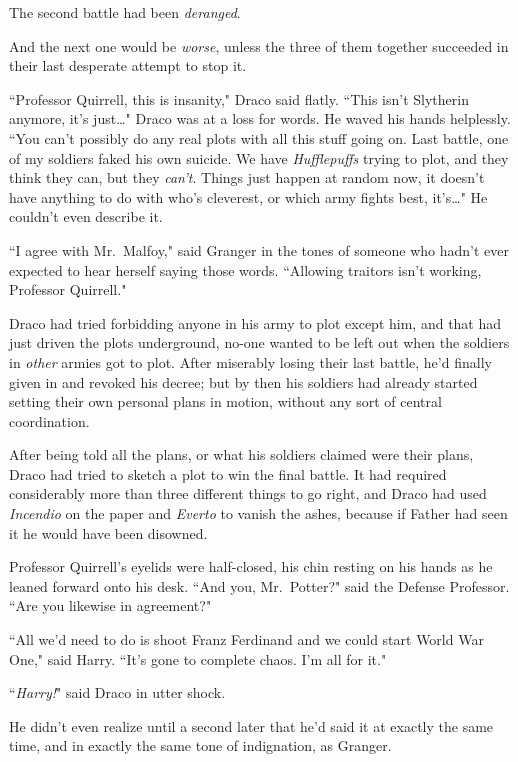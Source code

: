 The second battle had been \emph{deranged}.

And the next one would be \emph{worse}, unless the three of them together succeeded in their last desperate attempt to stop it.

``Professor Quirrell, this is insanity," Draco said flatly. ``This isn't Slytherin anymore, it's just{\ldots}" Draco was at a loss for words. He waved his hands helplessly. ``You can't possibly do any real plots with all this stuff going on. Last battle, one of my soldiers faked his own suicide. We have \emph{Hufflepuffs} trying to plot, and they think they can, but they \emph{can't}. Things just happen at random now, it doesn't have anything to do with who's cleverest, or which army fights best, it's{\ldots}" He couldn't even describe it.

``I agree with Mr.~Malfoy," said Granger in the tones of someone who hadn't ever expected to hear herself saying those words. ``Allowing traitors isn't working, Professor Quirrell."

Draco had tried forbidding anyone in his army to plot except him, and that had just driven the plots underground, no-one wanted to be left out when the soldiers in \emph{other} armies got to plot. After miserably losing their last battle, he'd finally given in and revoked his decree; but by then his soldiers had already started setting their own personal plans in motion, without any sort of central coordination.

After being told all the plans, or what his soldiers claimed were their plans, Draco had tried to sketch a plot to win the final battle. It had required considerably more than three different things to go right, and Draco had used \emph{Incendio} on the paper and \emph{Everto} to vanish the ashes, because if Father had seen it he would have been disowned.

Professor Quirrell's eyelids were half-closed, his chin resting on his hands as he leaned forward onto his desk. ``And you, Mr.~Potter?" said the Defense Professor. ``Are you likewise in agreement?"

``All we'd need to do is shoot Franz Ferdinand and we could start World War One," said Harry. ``It's gone to complete chaos. I'm all for it."

``\emph{Harry!}" said Draco in utter shock.

He didn't even realize until a second later that he'd said it at exactly the same time, and in exactly the same tone of indignation, as Granger.

